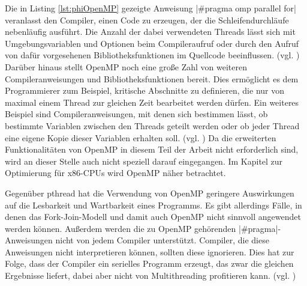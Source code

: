 \documentclass[../main.tex]{subfiles}
\begin{document}
Die in Listing \ref{lst:phiOpenMP} gezeigte Anweisung |#pragma omp parallel for| veranlasst den Compiler, einen Code zu erzeugen, der die Schleifendurchläufe nebenläufig ausführt. Die Anzahl der dabei verwendeten Threads lässt sich mit Umgebungsvariablen und Optionen beim Compileraufruf oder durch den Aufruf von dafür vorgesehenen Bibliotheksfunktionen im Quellcode beeinflussen. (vgl. \cite{phiOpenmpDoku}) Darüber hinaus stellt OpenMP noch eine große Zahl von weiteren Compileranweisungen und Bibliotheksfunktionen bereit. Dies ermöglicht es dem Programmierer zum Beispiel, kritische Abschnitte zu definieren, die nur von maximal einem Thread zur gleichen Zeit bearbeitet werden dürfen. Ein weiteres Beispiel sind Compileranweisungen, mit denen sich bestimmen lässt, ob bestimmte Variablen zwischen den Threads geteilt werden oder ob jeder Thread eine eigene Kopie dieser Variablen erhalten soll. (vgl. \cite{phiOpenmpDoku}) Da die erweiterten Funktionalitäten von OpenMP in diesem Teil der Arbeit nicht erforderlich sind, wird an dieser Stelle auch nicht speziell darauf eingegangen. Im Kapitel zur Optimierung für x86-CPUs wird OpenMP näher betrachtet. 

Gegenüber pthread hat die Verwendung von OpenMP geringere Auswirkungen auf die Lesbarkeit und Wartbarkeit eines Programms. Es gibt allerdings Fälle, in denen das Fork-Join-Modell und damit auch OpenMP nicht sinnvoll angewendet werden können. Außerdem werden die zu OpenMP gehörenden |#pragma|-Anweisungen nicht von jedem Compiler unterstützt. Compiler, die diese Anweisungen nicht interpretieren können, sollten diese ignorieren. Dies hat zur Folge, dass der Compiler ein serielles Programm erzeugt, das zwar die gleichen Ergebnisse liefert, dabei aber nicht von Multithreading profitieren kann. (vgl. \cite{phiOpenmpDoku})
\end{document}
